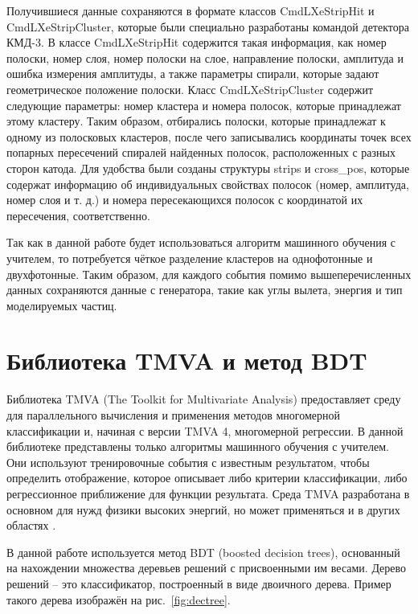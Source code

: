 \documentclass[14pt]{extarticle}
\begin{document}
Получившиеся данные сохраняются в формате классов CmdLXeStripHit и CmdLXeStripCluster, которые были
специально разработаны командой детектора КМД-3. В классе CmdLXeStripHit содержится такая
информация, как номер полоски, номер слоя, номер полоски на слое, направление полоски, амплитуда и
ошибка измерения амплитуды, а также параметры спирали, которые задают геометрическое положение
полоски. Класс CmdLXeStripCluster содержит следующие параметры: номер кластера и номера полосок,
которые принадлежат этому кластеру. Таким образом, отбирались полоски, которые принадлежат к одному
из полосковых кластеров, после чего записывались координаты точек всех попарных пересечений
спиралей найденных полосок, расположенных с разных сторон катода. Для удобства были созданы
структуры strips и cross\_pos, которые содержат информацию об индивидуальных свойствах полосок
(номер, амплитуда, номер слоя и т. д.) и номера пересекающихся полосок с координатой их пересечения, соответственно.

Так как в данной работе будет использоваться алгоритм машинного обучения с учителем, то потребуется
чёткое разделение кластеров на однофотонные и двухфотонные. Таким образом, для каждого события помимо
вышеперечисленных данных сохраняются данные с генератора, такие как углы вылета, энергия и тип
моделируемых частиц.

\section{Библиотека TMVA и метод BDT}
Библиотека TMVA (The Toolkit for Multivariate Analysis) предоставляет среду для параллельного вычисления и применения методов многомерной классификации и, начиная с версии TMVA 4, многомерной регрессии. В данной библиотеке представлены только алгоритмы машинного обучения с учителем. Они используют тренировочные события с известным результатом, чтобы определить отображение, которое описывает либо критерии классификации, либо регрессионное приближение для функции результата. Среда TMVA разработана в основном для нужд физики высоких энергий, но может применяться и в других областях \cite{tmva4}.

В данной работе используется метод BDT (boosted decision trees), основанный на нахождении множества деревьев решений с присвоенными им весами. Дерево решений -- это классификатор, построенный в виде двоичного дерева. Пример такого дерева изображён на рис.~\ref{fig:dectree}.
\end{document}

